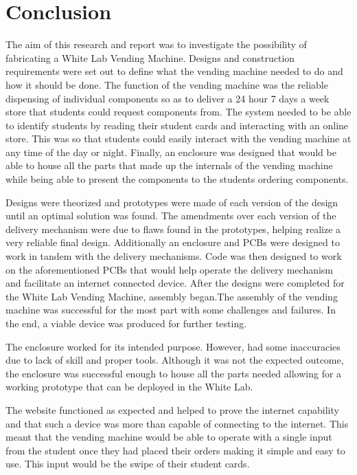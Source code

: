\documentclass[a4paper,11pt]{article}
\numberwithin{figure}{section}
\numberwithin{table}{section}
\begin{document}
\section{Conclusion}\thispagestyle{sectionstart}
The aim of this research and report was to investigate the possibility of fabricating a White Lab Vending Machine. Designs and construction requirements were set out to define what the vending machine needed to do and how it should be done. The function of the vending machine was the reliable dispensing of individual components so as to deliver a 24 hour 7 days a week store that students could request components from. The system needed to be able to identify students by reading their student cards and interacting with an online store. This was so that students could easily interact with the vending machine at any time of the day or night. Finally, an enclosure was designed that would be able to house all the parts that made up the internals of the vending machine while being able to present the components to the students ordering components.

Designs were theorized and prototypes were made of each version of the design until an optimal solution was found. The amendments over each version of the delivery mechanism were due to flaws found in the prototypes, helping realize a very reliable final design. Additionally an enclosure and PCBs were designed to work in tandem with the delivery mechanisms. Code was then designed to work on the aforementioned PCBs that would help operate the delivery mechanism and facilitate an internet connected device. After the designs were completed for the White Lab Vending Machine, assembly began.The assembly of the vending machine was successful for the most part with some challenges and failures. In the end, a viable device was produced for further testing. 

The enclosure worked for its intended purpose. However, had some inaccuracies due to lack of skill and proper tools. Although it was not the expected outcome, the enclosure was successful enough to house all the parts needed allowing for a working prototype that can be deployed in the White Lab.

The website functioned as expected and helped to prove the internet capability and that such a device was more than capable of connecting to the internet. This meant that the vending machine would be able to operate with a single input from the student once they had placed their orders making it simple and easy to use. This input would be the swipe of their student cards. 
\end{document}
